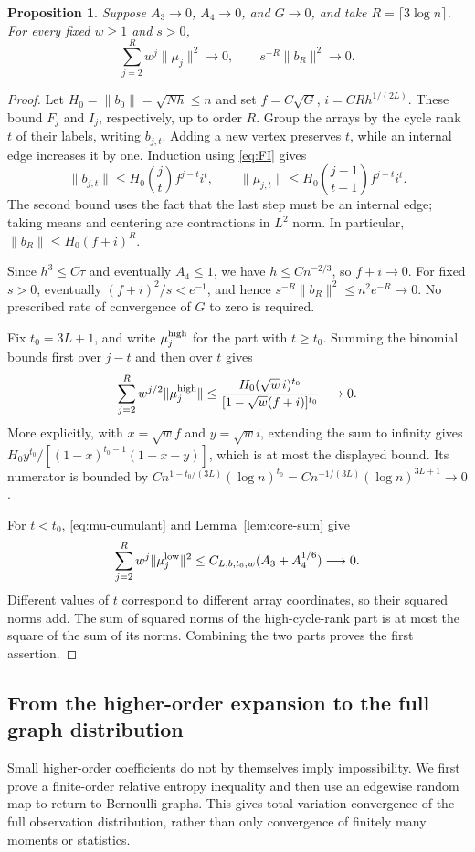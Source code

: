 \documentclass[11pt,reqno]{amsart}
\numberwithin{equation}{section}
\newtheorem{proposition}[theorem]{Proposition}
\theoremstyle{definition}
\theoremstyle{remark}
\theoremstyle{definition}
\begin{document}
\begin{proposition}\label{prop:array-small}
Suppose $A_3\to0$, $A_4\to0$, and $G\to0$, and take $R=\lceil3\log n\rceil$. For every fixed
$w\ge1$ and $s>0$,
\begin{equation}\label{eq:array-small}
 \sum_{j=2}^Rw^j\|\mu_j\|^2\longrightarrow0,
 \qquad s^{-R}\|b_R\|^2\longrightarrow0.
\end{equation}
\end{proposition}
\begin{proof}
Let $H_0=\|b_0\|=\sqrt{Nh}\le n$ and set
$f=C\sqrt G$, $i=CRh^{1/(2L)}$.
These bound $F_j$ and $I_j$, respectively, up to order $R$.
Group the arrays by the cycle rank $t$ of their labels, writing $b_{j,t}$.
Adding a new vertex preserves $t$, while an internal edge increases it by one. Induction using \eqref{eq:FI} gives
\[
 \|b_{j,t}\|\le H_0\binom jt f^{j-t}i^t,\qquad
 \|\mu_{j,t}\|\le H_0\binom{j-1}{t-1}f^{j-t}i^t.
\]
The second bound uses the fact that the last step must be an internal edge; taking means and centering are contractions in $L^2$ norm.
In particular, $\|b_R\|\le H_0(f+i)^R$.

Since $h^3\le C\tau$ and eventually $A_4\le1$, we have $h\le Cn^{-2/3}$,
so $f+i\to0$. For fixed $s>0$, eventually $(f+i)^2/s<e^{-1}$,
and hence $s^{-R}\|b_R\|^2\le n^2e^{-R}\to0$.
No prescribed rate of convergence of $G$ to zero is required.

Fix $t_0=3L+1$, and write $\mu_j^{\rm high}$ for the part with $t\ge t_0$.
Summing the binomial bounds first over $j-t$ and then over $t$ gives
\[
 \sum_{j=2}^Rw^{j/2}\|\mu_j^{\rm high}\|
 \le\frac{H_0(\sqrt w\,i)^{t_0}}
              {[1-\sqrt w(f+i)]^{t_0}}
 \longrightarrow0.
\]
More explicitly, with $x=\sqrt w f$ and $y=\sqrt w i$, extending the sum to infinity gives
$H_0y^{t_0}/[(1-x)^{t_0-1}(1-x-y)]$, which is at most the displayed bound.
Its numerator is bounded by
$C n^{1-t_0/(3L)}(\log n)^{t_0}=Cn^{-1/(3L)}(\log n)^{3L+1}\to0$.

For $t<t_0$, \eqref{eq:mu-cumulant} and Lemma~\ref{lem:core-sum} give
\[
 \sum_{j=2}^Rw^j\|\mu_j^{\rm low}\|^2
 \le C_{L,b,t_0,w}(A_3+A_4^{1/6})\longrightarrow0.
\]
Different values of $t$ correspond to different array coordinates, so their squared norms add.
The sum of squared norms of the high-cycle-rank part is at most the square of the sum of its norms.
Combining the two parts proves the first assertion.
\end{proof}

\subsection{From the higher-order expansion to the full graph distribution}\label{sec:entropy}
Small higher-order coefficients do not by themselves imply impossibility.
We first prove a finite-order relative entropy inequality and then use an edgewise random map to return to Bernoulli graphs.
This gives total variation convergence of the full observation distribution, rather than only convergence of finitely many moments or statistics.
\end{document}
